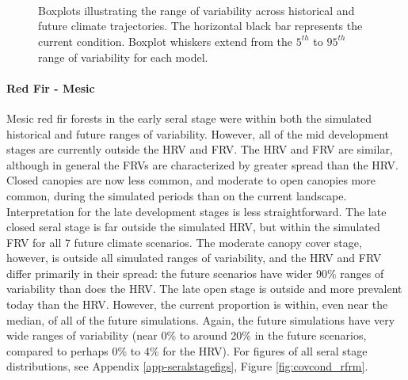 \begin{figure}[htbp]
  \centering
  \qquad
   \\
  \qquad
   \\
       \\
  \qquad
    \qquad
    \caption{Boxplots illustrating the range of variability across historical and future climate trajectories. The horizontal black bar represents the current condition. Boxplot whiskers extend from the $5^{th}$ to $95^{th}$ range of variability for each model. }
  \label{fig:covcond_ocfw}
\end{figure} %

\paragraph{Red Fir - Mesic} Mesic red fir forests in the early seral stage were within both the simulated historical and future ranges of variability. However, all of the mid development stages are currently outside the HRV and FRV. The HRV and FRV are similar, although in general the FRVs are characterized by greater spread than the HRV. Closed canopies are now less common, and moderate to open canopies more common, during the simulated periods than on the current landscape. Interpretation for the late development stages is less straightforward. The late closed seral stage is far outside the simulated HRV, but within the simulated FRV for all 7 future climate scenarios. The moderate canopy cover stage, however, is outside all simulated ranges of variability, and the HRV and FRV differ primarily in their spread: the future scenarios have wider 90\% ranges of variability than does the HRV. The late open stage is outside and more prevalent today than the HRV. However, the current proportion is within, even near the median, of all of the future simulations. Again, the future simulations have very wide ranges of variability (near 0\% to around 20\% in the future scenarios, compared to perhaps 0\% to 4\% for the HRV). For figures of all seral stage distributions, see Appendix \ref{app-seralstagefigs}, Figure \ref{fig:covcond_rfrm}.


